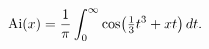 \[\mathop{\mathrm{Ai}\/}\nolimits\!\left(x\right)=\frac{1}{\pi}\int_{0}^{\infty}%
\mathop{\cos\/}\nolimits\!\left(\tfrac{1}{3}t^{3}+xt\right)dt.\]